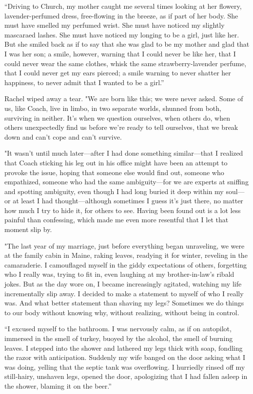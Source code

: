 ``Driving to Church, my mother caught me several times looking at her
flowery, lavender-perfumed dress, free-flowing in the breeze, as if part
of her body. She must have smelled my perfumed wrist. She must have
noticed my slightly mascaraed lashes. She must have noticed my longing
to be a girl, just like her. But she smiled back as if to say that she
was glad to be my mother and glad that I was her son; a smile, however,
warning that I could never be like her, that I could never wear the same
clothes, whisk the same strawberry-lavender perfume, that I could never
get my ears pierced; a smile warning to never shatter her happiness, to
never admit that I wanted to be a girl.''

Rachel wiped away a tear. "We are born like this; we were never asked.
Some of us, like Coach, live in limbo, in two separate worlds, shunned
from both, surviving in neither. It's when we question ourselves, when
others do, when others unexpectedly find us before we're ready to tell
ourselves, that we break down and can't cope and can't survive.

"It wasn't until much later---after I had done something similar---that
I realized that Coach sticking his leg out in his office might have been
an attempt to provoke the issue, hoping that someone else would find
out, someone who empathized, someone who had the same ambiguity---for we
are experts at sniffing and spotting ambiguity, even though I had long
buried it deep within my soul---or at least I had thought---although
sometimes I guess it's just there, no matter how much I try to hide it,
for others to see. Having been found out is a lot less painful than
confessing, which made me even more resentful that I let that moment
slip by.

"The last year of my marriage, just before everything began unraveling,
we were at the family cabin in Maine, raking leaves, readying it for
winter, reveling in the camaraderie. I camouflaged myself in the giddy
expectations of others, forgetting who I really was, trying to fit in,
even laughing at my brother-in-law's ribald jokes. But as the day wore
on, I became increasingly agitated, watching my life incrementally slip
away. I decided to make a statement to myself of who I really was. And
what better statement than shaving my legs? Sometimes we do things to
our body without knowing why, without realizing, without being in
control.

``I excused myself to the bathroom. I was nervously calm, as if on
autopilot, immersed in the smell of turkey, buoyed by the alcohol, the
smell of burning leaves. I stepped into the shower and lathered my legs
thick with soap, fondling the razor with anticipation. Suddenly my wife
banged on the door asking what I was doing, yelling that the septic tank
was overflowing. I hurriedly rinsed off my still-hairy, unshaven legs,
opened the door, apologizing that I had fallen asleep in the shower,
blaming it on the beer.''

